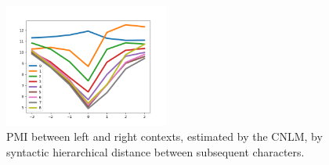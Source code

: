 \begin{figure}
\includegraphics[width=0.48\textwidth]{figures/segmentation-profile-pmis-german-all-heights.png}
\caption{PMI between left and right contexts, estimated by the CNLM, by syntactic hierarchical distance between subsequent characters.}\label{fig:syntax-depth}
\end{figure}


